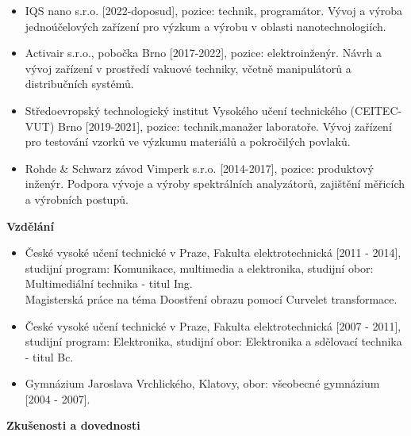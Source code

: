 \documentclass[12pt]{article}
\begin{document}
\begin{itemize}
\item IQS nano s.r.o. [2022-doposud], pozice: technik, programátor. Vývoj a výroba jednoúčelových zařízení pro výzkum a výrobu v oblasti nanotechnologiích.


\item Activair s.r.o., pobočka Brno [2017-2022], pozice: elektroinženýr. Návrh a vývoj zařízení v prostředí vakuové techniky, včetně manipulátorů a distribučních systémů.

\item 
Středoevropský technologický institut Vysokého učení technického 
(CEITEC-VUT) Brno [2019-2021], pozice: technik,manažer laboratoře. Vývoj zařízení pro testování vzorků ve výzkumu materiálů a pokročilých povlaků.

\item Rohde \& Schwarz závod Vimperk s.r.o. [2014-2017], pozice: produktový inženýr. Podpora vývoje a výroby spektrálních analyzátorů, zajištění měřicích a výrobních postupů. 
 
\end{itemize}

\textbf{Vzdělání}

\begin{itemize}
\item České vysoké učení technické v Praze, Fakulta elektrotechnická [2011 - 2014], studijní program: Komunikace, multimedia a elektronika, studijní obor: Multimediální technika - titul Ing. \\
Magisterská práce na téma Doostření obrazu pomocí Curvelet transformace.

\item České vysoké učení technické v Praze, Fakulta elektrotechnická [2007 - 2011], studijní program: Elektronika, studijní obor: Elektronika a sdělovací technika - titul Bc.


\item Gymnázium Jaroslava Vrchlického, Klatovy, 
obor: všeobecné gymnázium [2004 - 2007].
\end{itemize}

\textbf{Zkušenosti a dovednosti}
\end{document}

